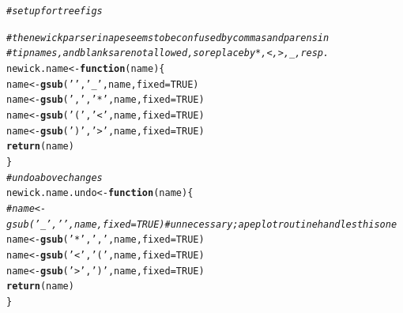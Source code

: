 \documentclass{article}\usepackage[]{graphicx}\usepackage[]{color}
\makeatletter
\newcommand{\hlnum}[1]{\textcolor[rgb]{0.686,0.059,0.569}{#1}}%
\newcommand{\hlstr}[1]{\textcolor[rgb]{0.192,0.494,0.8}{#1}}%
\newcommand{\hlcom}[1]{\textcolor[rgb]{0.678,0.584,0.686}{\textit{#1}}}%
\newcommand{\hlstd}[1]{\textcolor[rgb]{0.345,0.345,0.345}{#1}}%
\newcommand{\hlkwa}[1]{\textcolor[rgb]{0.161,0.373,0.58}{\textbf{#1}}}%
\newcommand{\hlkwb}[1]{\textcolor[rgb]{0.69,0.353,0.396}{#1}}%
\newcommand{\hlkwc}[1]{\textcolor[rgb]{0.333,0.667,0.333}{#1}}%
\newcommand{\hlkwd}[1]{\textcolor[rgb]{0.737,0.353,0.396}{\textbf{#1}}}%
\newenvironment{kframe}{%
 \def\at@end@of@kframe{}%
 \ifinner\ifhmode%
  \def\at@end@of@kframe{\end{minipage}}%
  \begin{minipage}{\columnwidth}%
 \fi\fi%
 \def\FrameCommand##1{\hskip\@totalleftmargin \hskip-\fboxsep
 \colorbox{shadecolor}{##1}\hskip-\fboxsep
     \hskip-\linewidth \hskip-\@totalleftmargin \hskip\columnwidth}%
 \MakeFramed {\advance\hsize-\width
   \@totalleftmargin\z@ \linewidth\hsize
   \@setminipage}}%
 {\par\unskip\endMakeFramed%
 \at@end@of@kframe}
\newenvironment{knitrout}{}{} %
\makeatother
\begin{document}
\begin{knitrout}\scriptsize
{}\color{fgcolor}\begin{kframe}
\begin{alltt}
\hlcom{# set up for tree figs}

\hlcom{# the newick parser in ape seems to be confused by commas and parens in}
\hlcom{# tip names, and blanks are not allowed, so replace by *, <, >, _, resp.}
\hlstd{newick.name} \hlkwb{<-} \hlkwa{function}\hlstd{(}\hlkwc{name}\hlstd{)\{}
  \hlstd{name} \hlkwb{<-} \hlkwd{gsub}\hlstd{(}\hlstr{' '}\hlstd{,} \hlstr{'_'}\hlstd{, name,} \hlkwc{fixed}\hlstd{=}\hlnum{TRUE}\hlstd{)}
  \hlstd{name} \hlkwb{<-} \hlkwd{gsub}\hlstd{(}\hlstr{','}\hlstd{,} \hlstr{'*'}\hlstd{, name,} \hlkwc{fixed}\hlstd{=}\hlnum{TRUE}\hlstd{)}
  \hlstd{name} \hlkwb{<-} \hlkwd{gsub}\hlstd{(}\hlstr{'('}\hlstd{,} \hlstr{'<'}\hlstd{, name,} \hlkwc{fixed}\hlstd{=}\hlnum{TRUE}\hlstd{)}
  \hlstd{name} \hlkwb{<-} \hlkwd{gsub}\hlstd{(}\hlstr{')'}\hlstd{,} \hlstr{'>'}\hlstd{, name,} \hlkwc{fixed}\hlstd{=}\hlnum{TRUE}\hlstd{)}
  \hlkwd{return}\hlstd{(name)}
\hlstd{\}}
\hlcom{# undo above changes}
\hlstd{newick.name.undo} \hlkwb{<-} \hlkwa{function}\hlstd{(}\hlkwc{name}\hlstd{)\{}
 \hlcom{#name <- gsub('_', ' ', name, fixed=TRUE) # unnecessary; ape plot routine handles this one}
  \hlstd{name} \hlkwb{<-} \hlkwd{gsub}\hlstd{(}\hlstr{'*'}\hlstd{,} \hlstr{','}\hlstd{, name,} \hlkwc{fixed}\hlstd{=}\hlnum{TRUE}\hlstd{)}
  \hlstd{name} \hlkwb{<-} \hlkwd{gsub}\hlstd{(}\hlstr{'<'}\hlstd{,} \hlstr{'('}\hlstd{, name,} \hlkwc{fixed}\hlstd{=}\hlnum{TRUE}\hlstd{)}
  \hlstd{name} \hlkwb{<-} \hlkwd{gsub}\hlstd{(}\hlstr{'>'}\hlstd{,} \hlstr{')'}\hlstd{, name,} \hlkwc{fixed}\hlstd{=}\hlnum{TRUE}\hlstd{)}
  \hlkwd{return}\hlstd{(name)}
\hlstd{\}}


\end{alltt}
\end{kframe}
\end{knitrout}
\end{document}

